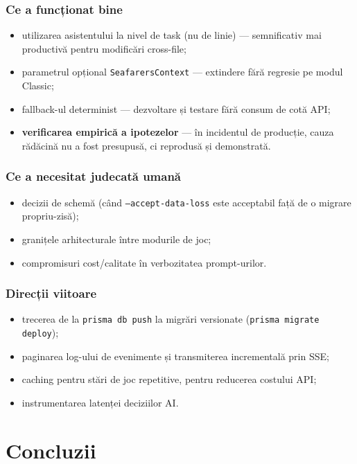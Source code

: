 \documentclass[11pt,a4paper]{article}
\begin{document}
\subsubsection{Ce a funcționat bine}
\begin{itemize}
  \item utilizarea asistentului la nivel de task (nu de linie) --- semnificativ
        mai productivă pentru modificări cross-file;
  \item parametrul opțional \texttt{SeafarersContext} --- extindere fără regresie
        pe modul Classic;
  \item fallback-ul determinist --- dezvoltare și testare fără consum de cotă API;
  \item \textbf{verificarea empirică a ipotezelor} --- în incidentul de producție,
        cauza rădăcină nu a fost presupusă, ci reprodusă și demonstrată.
\end{itemize}

\subsubsection{Ce a necesitat judecată umană}
\begin{itemize}
  \item decizii de schemă (când \texttt{--accept-data-loss} este acceptabil față
        de o migrare propriu-zisă);
  \item granițele arhitecturale între modurile de joc;
  \item compromisuri cost/calitate în verbozitatea prompt-urilor.
\end{itemize}

\subsubsection{Direcții viitoare}
\begin{itemize}
  \item trecerea de la \texttt{prisma db push} la migrări versionate
        (\texttt{prisma migrate deploy});
  \item paginarea log-ului de evenimente și transmiterea incrementală prin SSE;
  \item caching pentru stări de joc repetitive, pentru reducerea costului API;
  \item instrumentarea latenței deciziilor AI.
\end{itemize}

\section{Concluzii}
\end{document}
